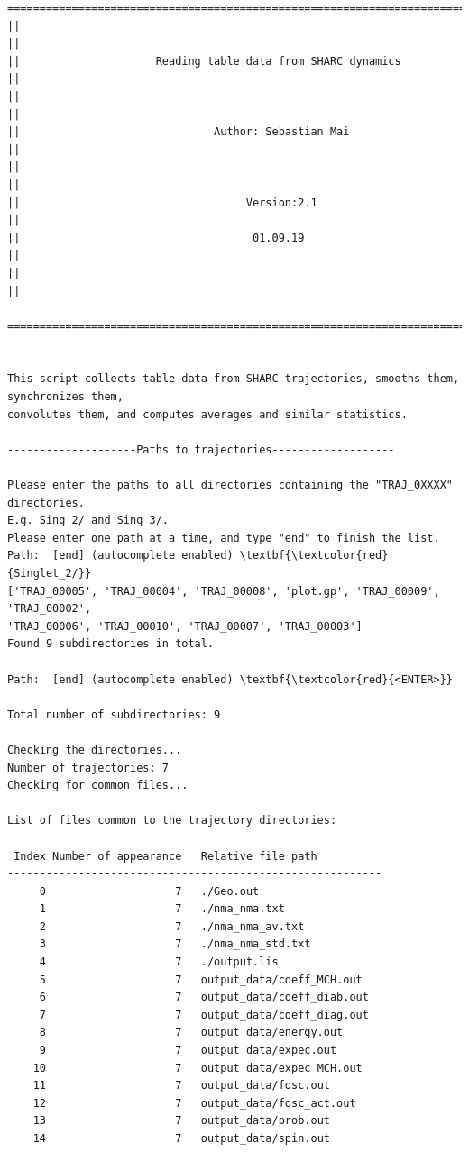 \documentclass[a4paper,11pt,DIV=15,openany]{scrbook}
\begin{document}
\begin{oframed}
\footnotesize\begin{Verbatim}[commandchars=\\\{\}]
  ================================================================================
||                                                                                ||
||                     Reading table data from SHARC dynamics                     ||
||                                                                                ||
||                              Author: Sebastian Mai                             ||
||                                                                                ||
||                                   Version:2.1                                  ||
||                                    01.09.19                                    ||
||                                                                                ||
  ================================================================================


This script collects table data from SHARC trajectories, smooths them, synchronizes them,
convolutes them, and computes averages and similar statistics.
  
--------------------Paths to trajectories-------------------

Please enter the paths to all directories containing the "TRAJ_0XXXX" directories.
E.g. Sing_2/ and Sing_3/. 
Please enter one path at a time, and type "end" to finish the list.
Path:  [end] (autocomplete enabled) \textbf{\textcolor{red}{Singlet_2/}}
['TRAJ_00005', 'TRAJ_00004', 'TRAJ_00008', 'plot.gp', 'TRAJ_00009', 'TRAJ_00002',
'TRAJ_00006', 'TRAJ_00010', 'TRAJ_00007', 'TRAJ_00003']
Found 9 subdirectories in total.

Path:  [end] (autocomplete enabled) \textbf{\textcolor{red}{<ENTER>}}

Total number of subdirectories: 9

Checking the directories...
Number of trajectories: 7
Checking for common files...

List of files common to the trajectory directories:

 Index Number of appearance   Relative file path
----------------------------------------------------------
     0                    7   ./Geo.out
     1                    7   ./nma_nma.txt
     2                    7   ./nma_nma_av.txt
     3                    7   ./nma_nma_std.txt
     4                    7   ./output.lis
     5                    7   output_data/coeff_MCH.out
     6                    7   output_data/coeff_diab.out
     7                    7   output_data/coeff_diag.out
     8                    7   output_data/energy.out
     9                    7   output_data/expec.out
    10                    7   output_data/expec_MCH.out
    11                    7   output_data/fosc.out
    12                    7   output_data/fosc_act.out
    13                    7   output_data/prob.out
    14                    7   output_data/spin.out


\end{Verbatim}
\end{oframed}
\end{document}
